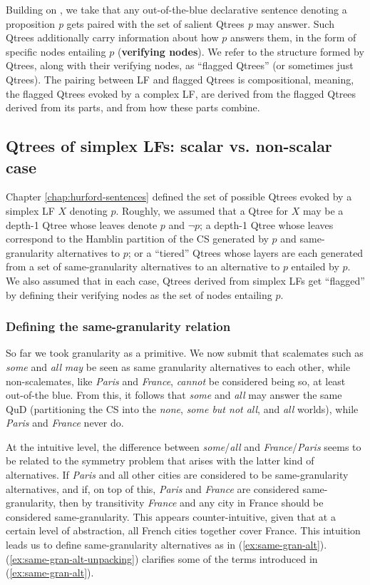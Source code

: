 	Building on \citet{Katzir2015,HenotMortier2024a,HenotMortier2024b}, we take that any out-of-the-blue declarative sentence denoting a proposition \textit{p} gets paired with the set of salient Qtrees \textit{p} may answer. Such Qtrees additionally carry information about how $p$ answers them, in the form of specific nodes entailing $p$ (\textbf{verifying nodes}). We refer to the structure formed by Qtrees, along with their verifying nodes, as ``flagged Qtrees'' (or sometimes just Qtrees). The pairing between LF and flagged Qtrees is compositional, meaning, the flagged Qtrees evoked by a complex LF, are derived from the flagged Qtrees derived from its parts, and from how these parts combine. 
	
	
	\subsection{Qtrees of simplex LFs: scalar vs. non-scalar case}
	Chapter \ref{chap:hurford-sentences} defined the set of possible Qtrees evoked by a simplex LF $X$ denoting $p$. Roughly, we assumed that a Qtree for $X$ may be a depth-1 Qtree whose leaves denote $p$ and $\neg p$; a depth-1 Qtree whose leaves correspond to the Hamblin partition of the CS generated by $p$ and same-granularity alternatives to $p$; or a ``tiered'' Qtrees whose layers are each generated from a set of same-granularity alternatives to an alternative to $p$ entailed by $p$. We also assumed that in each case, Qtrees derived from simplex LFs get ``flagged'' by defining their verifying nodes as the set of nodes entailing $p$.
	
	
	\subsubsection{Defining the same-granularity relation}
	So far we took granularity as a primitive. We now submit that scalemates such as \textit{some} and \textit{all} \textit{may} be seen as same granularity alternatives to each other, while non-scalemates, like \textit{Paris} and \textit{France}, \textit{cannot} be considered being so, at least out-of-the blue. From this, it follows that \textit{some} and \textit{all} may answer the same QuD (partitioning the CS into the \textit{none}, \textit{some but not all}, and \textit{all} worlds), while \textit{Paris} and \textit{France} never do.
	
	At the intuitive level, the difference between \textit{some}/\textit{all} and \textit{France}/\textit{Paris} seems to be related to the symmetry problem \citep{Kroch1972,Fox2007} that arises with the latter kind of alternatives. If \textit{Paris} and all other cities are considered to be same-granularity alternatives, and if, on top of this, \textit{Paris} and \textit{France} are considered same-granularity, then by transitivity \textit{France} and any city in France should be considered same-granularity. This appears counter-intuitive, given that at a certain level of abstraction, all French cities together cover France. This intuition leads us to define same-granularity alternatives as in (\ref{ex:same-gran-alt}). (\ref{ex:same-gran-alt-unpacking}) clarifies some of the terms introduced in (\ref{ex:same-gran-alt}).
	
